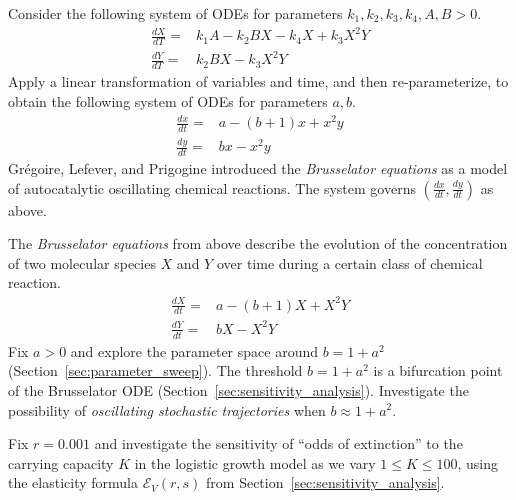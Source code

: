 \begin{exercises}
\item \label{ex:hw_brusselator_transform}
Consider the following system of ODEs for parameters $k_1, k_2, k_3, k_4, A, B > 0$.
\begin{align*}
\frac{dX}{dT} =& k_1 A - k_2 B X - k_4 X + k_3 X^2 Y\\
\frac{dY}{dT} =& k_2 B X - k_3 X^2 Y
\end{align*}
Apply a linear transformation of variables and time, and then re-parameterize, to obtain the following system of ODEs for parameters $a, b$.
\begin{align*}
\frac{dx}{dt} =& a - (b+1)x + x^2 y\\
\frac{dy}{dt} =& bx - x^2 y
\end{align*}
Gr{\'e}goire, Lefever, and Prigogine \cite{prigogine1968symmetry, lefever1971chemical} introduced the \textit{Brusselator equations} as a model of autocatalytic oscillating chemical reactions. The system governs $(\frac{dx}{dt}, \frac{dy}{dt})$ as above.

\item \label{ex:hw_brusselator_stochastic}
The \textit{Brusselator equations} from above describe the evolution of the concentration of two molecular species $X$ and $Y$ over time during a certain class of chemical reaction.
\begin{align*}
\frac{dX}{dt} =& a - (b+1)X + X^2 Y \\
\frac{dY}{dt} =& bX - X^2 Y
\end{align*}
Fix $a > 0$ and explore the parameter space around $b = 1 + a^2$ (Section~\ref{sec:parameter_sweep}). The threshold $b = 1 + a^2$ is a bifurcation point of the Brusselator ODE (Section~\ref{sec:sensitivity_analysis}). Investigate the possibility of \textit{oscillating stochastic trajectories} when $b \approx 1 + a^2$.

\item \label{ex:hw_logistic_growth_extinction_sensitivity}
Fix $r = 0.001$ and investigate the sensitivity of ``odds of extinction'' to the carrying capacity $K$ in the logistic growth model as we vary $1 \leq K \leq 100$, using the elasticity formula $\mathcal{E}_{V}(r,s)$ from Section~\ref{sec:sensitivity_analysis}.


\end{exercises}
